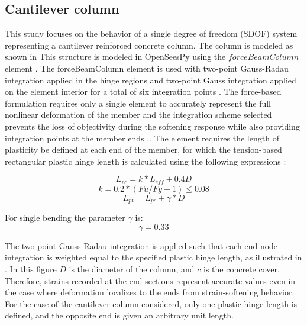 \subsection{Cantilever column}
This study focuses on the behavior of a single degree of freedom (SDOF) system representing a cantilever reinforced concrete column. The column is modeled as shown in  This structure is modeled in OpenSeesPy \cite{McKenna2010}\cite{Zhu2018} using the $forceBeamColumn$ element \cite{Scott}. The forceBeamColumn element is used with two-point Gauss-Radau integration applied in the hinge regions and two-point Gauss integration applied on the element interior for a total of six integration points \cite{Scott}. The force-based formulation requires only a single element to accurately represent the full nonlinear deformation of the member and the integration scheme selected prevents the loss of objectivity during the softening response while also providing integration points at the member ends \cite{Calabrese2010},\cite{Scott}. The element requires the length of plasticity be defined at each end of the member, for which the tension-based rectangular plastic hinge length is calculated using the following expressions \cite{Goodnight2013}:

\begin{equation}
    L_{pc}=k*L_{eff} + 0.4D
    \label{eq:LP_Comp}
\end{equation}
\begin{equation}
	k=0.2*(Fu/Fy - 1) \leqslant 0.08
	\label{eq:K_Lp}
\end{equation}
\begin{equation}
    L_{pt}=L_{pc}+\gamma*D
    \label{eq:LP_Tension}
\end{equation}

For single bending the parameter $\gamma$ is:
\begin{equation}
    \gamma=0.33
    \label{eq:Gamma_LPt}
\end{equation}

The two-point Gauss-Radau integration is applied such that each end node integration is weighted equal to the specified plastic hinge length, as illustrated in . In this figure $D$ is the diameter of the column, and $c$ is the concrete cover. Therefore, strains recorded at the end sections represent accurate values even in the case where deformation localizes to the ends from strain-softening behavior. For the case of the cantilever column considered, only one plastic hinge length is defined, and the opposite end is given an arbitrary unit length. 

